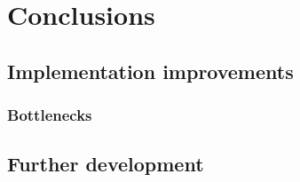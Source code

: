 
\section{Conclusions}\label{section:conclusions}

\subsection{Implementation improvements}\label{section:impl-improvements}


\subsubsection{Bottlenecks}\label{section:bottlenecks}


\subsection{Further development}\label{section:further-dev}

